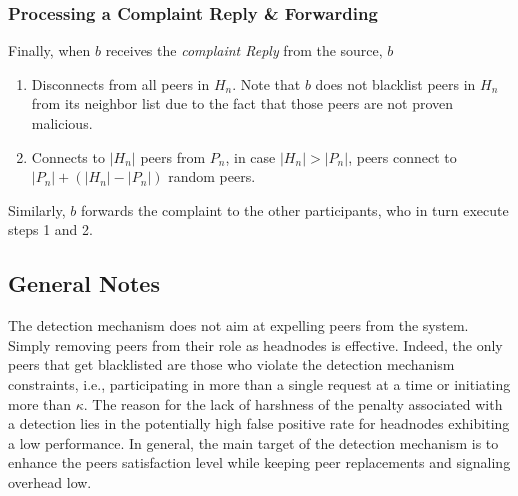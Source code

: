 \subsubsection*{Processing a Complaint Reply \& Forwarding}

Finally, when $b$ receives the \textit{complaint Reply} from the source, $b$ 
\begin{enumerate}
 \item Disconnects from all peers in $H_n$. Note that $b$ does not blacklist peers in $H_n$ from its neighbor list due to the fact that those peers are not proven malicious.
 \item Connects to $|H_n|$ peers from $P_n$, in case $|H_n|>|P_n|$, peers connect to $|P_n|+(|H_n|-|P_n|)$ random peers.
\end{enumerate}
Similarly, $b$ forwards the complaint to the other participants, who in turn execute steps 1 and 2.

\subsection{General Notes}
The detection mechanism does not aim at expelling peers from the system. Simply  removing peers from their role as headnodes is effective.
Indeed, the only peers that get blacklisted are those who violate the detection mechanism constraints, i.e., participating in more than a single request at a time or initiating more than $\kappa$.
The reason for the lack of harshness of the penalty associated with a detection lies in the potentially high false positive rate for headnodes exhibiting a low performance. 
In general, the main target of the detection mechanism is to enhance the peers satisfaction level while keeping peer replacements and signaling overhead low.







